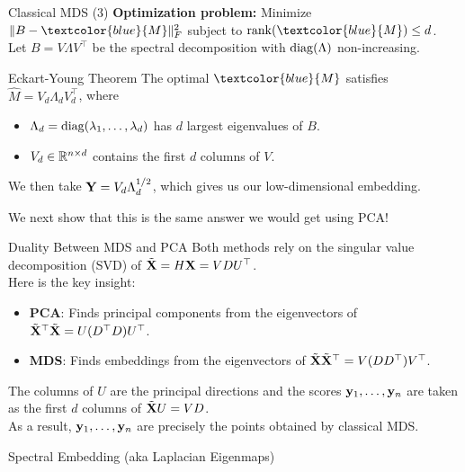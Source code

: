 \documentclass[11pt,handout,aspectratio=169]{beamer}
\begin{document}
\begin{frame}{Classical MDS (3)}
\textbf{Optimization problem:} Minimize $\|B-\textcolor{blue}{M}\|^2_F$ subject to ${\rm rank}(\textcolor{blue}{M})\leq d$.\\[5mm]
	Let $B=V \Lambda V^\top$ be the spectral decomposition with ${\rm diag}(\Lambda)$ non-increasing.
\begin{alertblock}{Eckart-Young Theorem}
The optimal $\textcolor{blue}{M}$ satisfies $\widehat M=V_d\Lambda_d V_d^\top$, where 
\begin{itemize}
	\item $\Lambda_d={\rm diag}(\lambda_1,\ldots,\lambda_d)$ has $d$ largest eigenvalues of $B$.
	\item $V_d\in \mathbb R^{n\times d}	$ contains the first $d$ columns of $V$. 
\end{itemize}
We then take $\mathbf{Y}=V_d\Lambda_d^{1/2}$, which gives us our low-dimensional embedding.
\end{alertblock}
\bigskip 

We next show that this is the same answer we would get using PCA!
\end{frame}

\begin{frame}{Duality Between MDS and PCA}
Both methods rely on the singular value decomposition (SVD) of $\tilde {\mathbf{X}}=H\mathbf{X}=VDU^\top$.\\[5mm]
Here is the key insight:
\begin{itemize}
    \item \textbf{PCA}: Finds principal components from the eigenvectors of $\tilde{\mathbf{X}}^{\top}\tilde{\mathbf{X}}=U (D^\top D) U^\top$.
    \item \textbf{MDS}: Finds embeddings from the eigenvectors of $\tilde{\mathbf{X}}\tilde{\mathbf{X}}^{\top}=V(DD^\top) V^\top$.\\[5mm]
\end{itemize}
The columns of $U$ are the principal directions and the scores $\mathbf{y}_1,\ldots,\mathbf{y}_n$ are taken as the first $d$ columns of $\tilde{\mathbf{X}} U=VD$.\\[5mm]


As a result, $\mathbf{y}_1,\ldots,\mathbf{y}_n$ are precisely the points obtained by classical MDS. 
\end{frame}

\begin{frame}{}
    \begin{center}
        \alert{\Huge Spectral Embedding (aka Laplacian Eigenmaps)}
    \end{center}
\end{frame}
\end{document}
